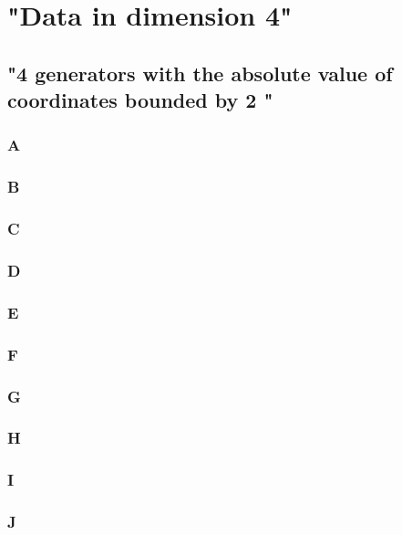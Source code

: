 \section{"Data in dimension 4"}
\subsection{"4 generators with the absolute value of coordinates bounded by 2
"}

\subsubsection{A}

\newpage
\subsubsection{B}

\newpage
\subsubsection{C}

\newpage
\subsubsection{D}

\newpage
\subsubsection{E}

\newpage
\subsubsection{F}

\newpage
\subsubsection{G}

\newpage
\subsubsection{H}

\newpage
\subsubsection{I}

\newpage
\subsubsection{J}

\newpage
